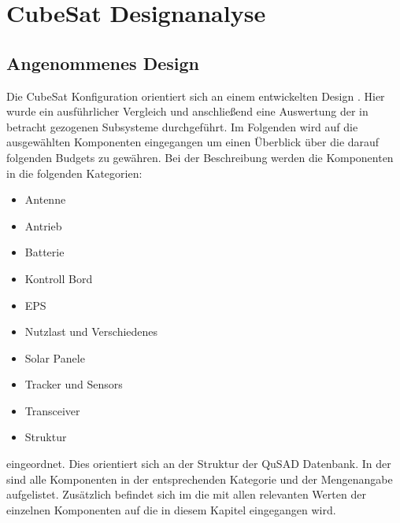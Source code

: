 		\section{CubeSat Designanalyse}
				\subsection{Angenommenes Design}
				Die CubeSat Konfiguration orientiert sich an einem entwickelten Design \cite{Lettau.}. Hier wurde ein ausführlicher Vergleich und anschließend eine Auswertung der in betracht gezogenen Subsysteme durchgeführt. Im Folgenden wird auf die ausgewählten Komponenten eingegangen um einen Überblick über die darauf folgenden Budgets zu gewähren. Bei der Beschreibung werden die Komponenten in die folgenden Kategorien: 
				\begin{itemize}
					\item Antenne
					\item Antrieb
					\item Batterie
					\item Kontroll Bord
					\item EPS
					\item Nutzlast und Verschiedenes 
					\item Solar Panele
					\item Tracker und Sensors
					\item Transceiver
					\item Struktur
				\end{itemize}
eingeordnet. Dies orientiert sich an der Struktur der QuSAD Datenbank. In der  sind alle Komponenten in der entsprechenden Kategorie und der Mengenangabe aufgelistet. Zusätzlich befindet sich im  die  mit allen relevanten Werten der einzelnen Komponenten auf die in diesem Kapitel eingegangen wird.
				
